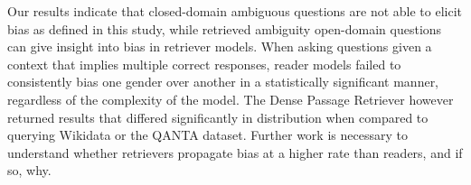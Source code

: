 Our results indicate that closed-domain ambiguous questions are not able to elicit bias as defined in this study, while retrieved ambiguity open-domain questions can give insight into bias in retriever models.  When asking questions given a context that implies multiple correct responses, reader models failed to consistently bias one gender over another in a statistically significant manner, regardless of the complexity of the model.  The Dense Passage Retriever however returned results that differed significantly in distribution when compared to querying Wikidata or the QANTA dataset.
Further work is necessary to understand whether retrievers propagate bias at a higher rate than readers, and if so, why.




